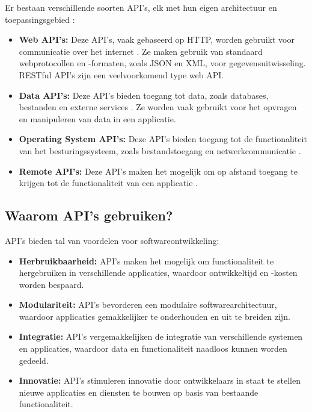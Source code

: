 Er bestaan verschillende soorten API's, elk met hun eigen architectuur en toepassingsgebied \autocite{Goodwin2024}:

\begin{itemize}
  \item \textbf{Web API's:} Deze API's, vaak gebaseerd op HTTP, worden gebruikt voor communicatie over het internet \autocite{Goodwin2024}. Ze maken gebruik van standaard webprotocollen en -formaten, zoals JSON en XML, voor gegevensuitwisseling. RESTful API's zijn een veelvoorkomend type web API.
  \item \textbf{Data API's:} Deze API's bieden toegang tot data, zoals databases, bestanden en externe services \autocite{Goodwin2024}. Ze worden vaak gebruikt voor het opvragen en manipuleren van data in een applicatie.
  \item \textbf{Operating System API's:} Deze API's bieden toegang tot de functionaliteit van het besturingssysteem, zoals bestandstoegang en netwerkcommunicatie \autocite{Goodwin2024}.
  \item \textbf{Remote API's:} Deze API's maken het mogelijk om op afstand toegang te krijgen tot de functionaliteit van een applicatie \autocite{Goodwin2024}.
\end{itemize}

\subsection{Waarom API's gebruiken?}

API's bieden tal van voordelen voor softwareontwikkeling:

\begin{itemize}
  \item \textbf{Herbruikbaarheid:} API's maken het mogelijk om functionaliteit te hergebruiken in verschillende applicaties, waardoor ontwikkeltijd en -kosten worden bespaard.
  \item \textbf{Modulariteit:} API's bevorderen een modulaire softwarearchitectuur, waardoor applicaties gemakkelijker te onderhouden en uit te breiden zijn.
  \item \textbf{Integratie:} API's vergemakkelijken de integratie van verschillende systemen en applicaties, waardoor data en functionaliteit naadloos kunnen worden gedeeld.
  \item \textbf{Innovatie:} API's stimuleren innovatie door ontwikkelaars in staat te stellen nieuwe applicaties en diensten te bouwen op basis van bestaande functionaliteit.
\end{itemize}

